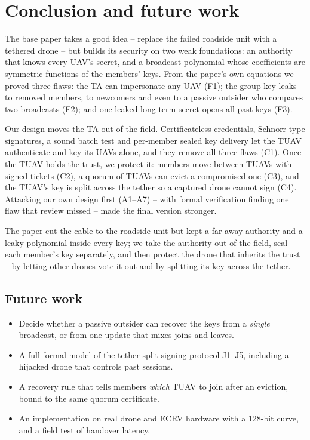 \chapter{Conclusion and future work}\label{ch:concl}
The base paper takes a good idea -- replace the failed roadside unit with a tethered drone -- but builds its security on two weak foundations: an authority
that knows every UAV's secret, and a broadcast polynomial whose coefficients are symmetric functions of the members' keys. From the paper's own equations
we proved three flaws: the TA can impersonate any UAV (F1); the group key leaks to removed members, to newcomers and even to a passive outsider who compares
two broadcasts (F2); and one leaked long-term secret opens all past keys (F3).

Our design moves the TA out of the field. Certificateless credentials, Schnorr-type signatures, a sound batch test and per-member sealed key delivery let
the TUAV authenticate and key its UAVs alone, and they remove all three flaws (C1). Once the TUAV holds the trust, we protect it: members move between
TUAVs with signed tickets (C2), a quorum of TUAVs can evict a compromised one (C3), and the TUAV's key is split across the tether so a captured drone
cannot sign (C4). Attacking our own design first (A1--A7) -- with formal verification finding one flaw that review missed -- made the final version
stronger.

\begin{plainbox}[title={The one-sentence summary}]
The paper cut the cable to the roadside unit but kept a far-away authority and a leaky polynomial inside every key; we take the authority out of the field,
seal each member's key separately, and then protect the drone that inherits the trust -- by letting other drones vote it out and by splitting its key across
the tether.
\end{plainbox}

\section*{Future work}
\begin{itemize}[leftmargin=*]
\item Decide whether a passive outsider can recover the keys from a \emph{single} broadcast, or from one update that mixes joins and leaves.
\item A full formal model of the tether-split signing protocol J1--J5, including a hijacked drone that controls past sessions.
\item A recovery rule that tells members \emph{which} TUAV to join after an eviction, bound to the same quorum certificate.
\item An implementation on real drone and ECRV hardware with a 128-bit curve, and a field test of handover latency.
\end{itemize}
